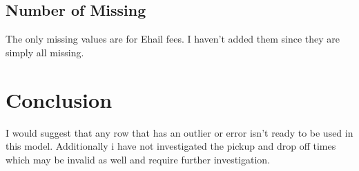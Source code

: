 \documentclass{article}
\begin{document}
\subsection{Number of Missing}
The only missing values are for Ehail fees. I haven't added them since they are simply all missing.

\section{Conclusion}
I would suggest that any row that has an outlier or error isn't ready to be used in this model. Additionally i have not investigated the pickup and drop off times which may be invalid as well and require further investigation.
\end{document}
